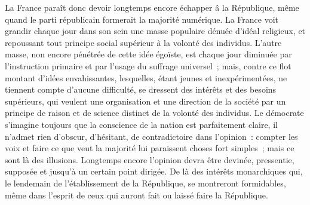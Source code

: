 \documentclass[french,twoside]{book} %
\begin{document}
La France paraît donc devoir longtemps encore échapper â la République, même quand le parti républicain formerait la majorité numérique. La France voit grandir chaque jour dans son sein une masse populaire dénuée d’idéal religieux, et repoussant tout principe social supérieur à la volonté des individus. L’autre masse, non encore pénétrée de cette idée égoïste, est chaque jour diminuée par l’instruction primaire et par l’usage du suffrage universel ; mais, contre ce flot montant d’idées envahissantes, lesquelles, étant jeunes et inexpérimentées, ne tiennent compte d’aucune difficulté, se dressent des intérêts et des besoins supérieurs, qui veulent une organisation et une direction de la société par un principe de raison et de science distinct de la volonté des individus. Le démocrate s’imagine toujours que la conscience de la nation est parfaitement claire, il n’admet rien d’obscur, d’hésitant, de contradictoire dans l’opinion : compter les voix et faire ce que veut la majorité lui paraissent choses fort simples ; mais ce sont là des illusions. Longtemps encore l’opinion devra être devinée, pressentie, supposée et jusqu’à un certain point dirigée. De là des intérêts monarchiques qui, le lendemain de l’établissement de la République, se montreront formidables, même dans l’esprit de ceux qui auront fait ou laissé faire la République.\par
\end{document}
